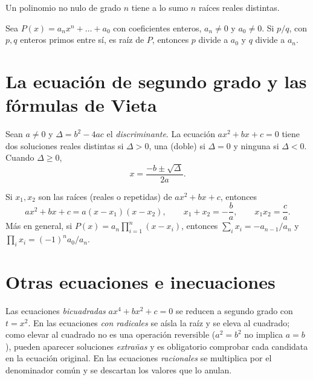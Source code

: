\addtocounter{definicion}{1}%

\begin{corolario}\label{cor:raices}
Un polinomio no nulo de grado $n$ tiene a lo sumo $n$ raíces reales distintas.
\end{corolario}

\begin{teorema}\label{teo:raices-racionales}
Sea $P(x)=a_nx^n+\dots+a_0$ con coeficientes enteros, $a_n\neq0$ y $a_0\neq0$. Si $p/q$, con $p,q$ enteros primos entre sí, es raíz de $P$, entonces $p$ divide a $a_0$ y $q$ divide a $a_n$.
\end{teorema}

\section{La ecuación de segundo grado y las fórmulas de Vieta}

\begin{teorema}\label{teo:cuadratica}
Sean $a\neq0$ y $\Delta=b^2-4ac$ el \emph{discriminante}. La ecuación $ax^2+bx+c=0$ tiene dos soluciones reales distintas si $\Delta>0$, una (doble) si $\Delta=0$ y ninguna si $\Delta<0$. Cuando $\Delta\ge0$,
\[
x=\frac{-b\pm\sqrt{\Delta}}{2a}.
\]
\end{teorema}

\begin{proposicion}\label{prop:vieta}
Si $x_1,x_2$ son las raíces (reales o repetidas) de $ax^2+bx+c$, entonces
\[
ax^2+bx+c=a(x-x_1)(x-x_2),\qquad x_1+x_2=-\frac ba,\qquad x_1x_2=\frac ca.
\]
Más en general, si $P(x)=a_n\prod_{i=1}^n(x-x_i)$, entonces $\sum_ix_i=-a_{n-1}/a_n$ y $\prod_ix_i=(-1)^na_0/a_n$.
\end{proposicion}

\addtocounter{definicion}{1}%

\section{Otras ecuaciones e inecuaciones}

Las ecuaciones \emph{bicuadradas} $ax^4+bx^2+c=0$ se reducen a segundo grado con $t=x^2$. En las ecuaciones \emph{con radicales} se aísla la raíz y se eleva al cuadrado; como elevar al cuadrado no es una operación reversible ($a^2=b^2$ no implica $a=b$), pueden aparecer soluciones \emph{extrañas} y es obligatorio comprobar cada candidata en la ecuación original. En las ecuaciones \emph{racionales} se multiplica por el denominador común y se descartan los valores que lo anulan.


